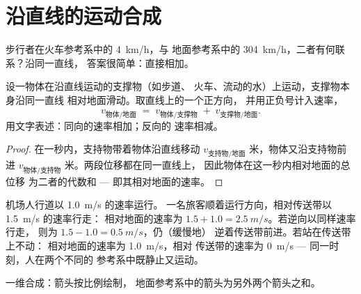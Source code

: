 \section{沿直线的运动合成}

步行者在火车参考系中的 \qty{4}{km/h}，与
地面参考系中的 \qty{304}{km/h}，二者有何联系？沿同一直线，
答案很简单：直接相加。

\begin{proposition}[一维速率的合成]\label{prop:g10:relative-motion:compose}
设一物体在沿直线运动的支撑物（如步道、
火车、流动的水）上运动，支撑物本身沿同一直线
相对地面滑动。取直线上的一个正方向，
并用正负号计入速率，
\[
v_{\text{物体/地面}} \;=\; v_{\text{物体/支撑物}} \;+\;
v_{\text{支撑物/地面}} .
\]
用文字表述：同向的速率相加；反向的
速率相减。
\end{proposition}

\begin{proof}
在一秒内，支持物带着物体沿直线移动 $v_{\text{支持物/地面}}$
米，物体又沿支持物前进 $v_{\text{物体/支持物}}$
米。两段位移都在同一直线上，
因此物体在这一秒内相对地面的总位移
为二者的代数和 --- 即其相对地面的速率。
\end{proof}

\begin{example}[移动人行道]\label{ex:g10:relative-motion:walkway}
机场人行道以 \qty{1.0}{m/s} 的速率运行。
一名旅客顺着运行方向，相对传送带以 \qty{1.5}{m/s} 的速率行走：
相对地面的速率为 $1.5 + 1.0 = \qty{2.5}{m/s}$。若逆向以同样速率行走，
则为 $1.5 - 1.0 = \qty{0.5}{m/s}$，仍（缓慢地）
逆着传送带前进。若站在传送带上不动：
相对地面的速率为 \qty{1.0}{m/s}，相对
传送带的速率为 \qty{0}{m/s} --- 同一时刻，人在两个不同的
参考系中既静止又运动。
\end{example}

\begin{omfigure}

{\small 一维合成：箭头按比例绘制，
地面参考系中的箭头为另外两个箭头之和。}
\end{omfigure}


